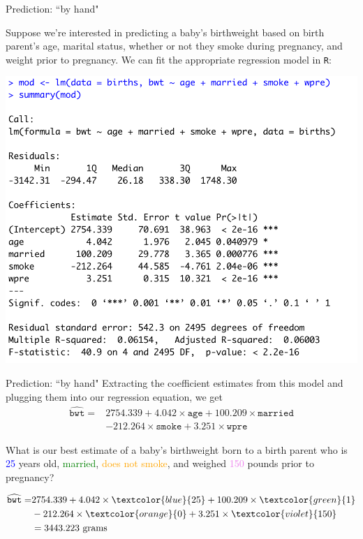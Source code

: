 \documentclass[10pt,t]{beamer}
\begin{document}
\begin{frame}{Prediction: ``by hand"}
\vspace{-5 mm}

Suppose we're interested in predicting a baby's birthweight based on birth parent's age, marital status, whether or not they smoke during pregnancy, and weight prior to pregnancy. We can fit the appropriate regression model in \texttt{R}:

\vspace{0.2cm}

\centering \includegraphics[scale=0.4]{figures/predict_reg.png}
\end{frame}

\begin{frame}{Prediction: ``by hand"}
Extracting the coefficient estimates from this model and plugging them into our regression equation, we get
\begin{align*}
\widehat{\texttt{bwt}} = & 2754.339 + 4.042 \times \texttt{age} + 100.209 \times \texttt{married} \\
& - 212.264 \times \texttt{smoke} + 3.251 \times \texttt{wpre} 
\end{align*} 

What is our best estimate of a baby's birthweight born to a birth parent who is \textcolor{blue}{25} years old, \textcolor{green}{married}, \textcolor{orange}{does not smoke}, and weighed \textcolor{violet}{150} pounds prior to pregnancy? 

\begin{align*}
\widehat{\texttt{bwt}} = & 2754.339 + 4.042 \times \textcolor{blue}{25} + 100.209 \times \textcolor{green}{1} \\
& - 212.264 \times \textcolor{orange}{0} + 3.251 \times \textcolor{violet}{150}  \\
& = 3443.223 \text{ grams}
\end{align*}

\end{frame}
\end{document}
